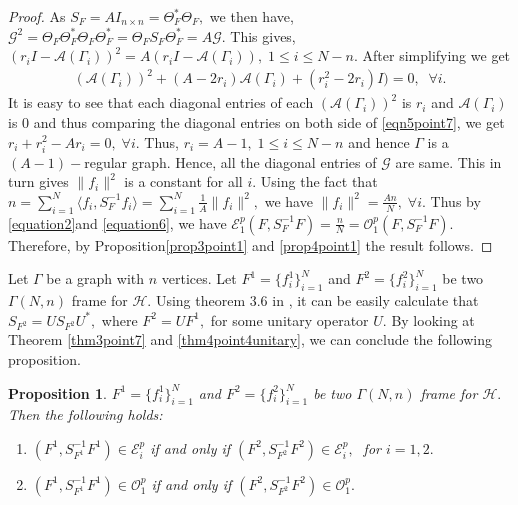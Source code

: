 \documentclass[final,1p,times]{elsarticle}
\newtheorem{prop}[thm]{Proposition}
\begin{document}
\begin{proof}
	As $S_F = AI_{n\times n} = \Theta_{F}^* \Theta_F,$ we then have, $\mathcal{G}^2 = \Theta_F \Theta_{F}^{*} \Theta_F \Theta_{F}^{*} = \Theta_F S_F \Theta_{F}^* = A\mathcal{G}.$ This gives, $\left( r_{i} I -\mathcal{A}(\Gamma_i)    \right)^2 = A\left( r_{i} I -\mathcal{A}(\Gamma_i)    \right),\;1 \leq i \leq N-n.$ After simplifying we get 
	\begin{align}\label{eqn5point7}
		\left(\mathcal{A}(\Gamma_i)\right)^2 + (A- 2r_i)\mathcal{A}(\Gamma_i) + (r_{i}^2 - 2r_i)I) =0 , \;\;\forall i.
		\end{align} 
	 It is easy to see that each diagonal entries of each $\left(\mathcal{A}(\Gamma_i)\right)^2$ is $r_i$ and $\mathcal{A}(\Gamma_i)$ is $0$ and thus comparing the  diagonal entries on both side of \eqref{eqn5point7}, we get $r_{i} + r_{i}^2 - Ar_{i} =0,\; \forall i. $ Thus, $r_i = A -1,\; 1\leq i \leq N-n$ and hence $\Gamma$ is a $(A-1)-$regular graph. Hence, all the diagonal entries of $\mathcal{G}$ are same. This in turn gives $\|f_i\|^2$ is a constant for all $i.$ Using the fact that $n =\sum\limits_{i=1}^N \langle f_i,S_{F}^{-1}f_i \rangle = \sum\limits_{i=1}^N \frac{1}{A}\|f_i\|^2,$ we have $\|f_i\|^2 = \frac{An}{N},\; \forall i.$ Thus by \eqref{equation2}and \eqref{equation6}, we have $\mathcal{E}_{1}^p (F, S_{F}^{-1}F) = \frac{n}{N}= \mathcal{O}_{1}^p (F, S_{F}^{-1}F). $ Therefore, by Proposition\ref{prop3point1} and \ref{prop4point1} the result follows.
	
\end{proof}

Let $\Gamma$ be a graph with $n$ vertices. Let $F^{1} = \{f^{1}_i\}_{i=1}^N$ and  $F^{2} = \{f^{2}_i\}_{i=1}^N$ be two $\Gamma(N,n)$ frame for $\mathcal{H}.$  Using theorem 3.6 in \cite{deep1}, it can be easily calculate that $S_{F^{2}} = U S_{F^{2}} U^{*},$ where $F^{2} = U F^{1},$ for some unitary operator $U.$ By looking at Theorem \ref{thm3point7} and \ref{thm4point4unitary}, we can conclude the following proposition.


\begin{prop}
	 $F^{1} = \{f^{1}_i\}_{i=1}^N$ and  $F^{2} = \{f^{2}_i\}_{i=1}^N$ be two $\Gamma(N,n)$ frame for $\mathcal{H}.$ Then the following holds:
	 	\begin{enumerate}
	 	\item [{\em (i)}] $\left(F^1 , S_{F^1}^{-1}F^{1}  \right) \in \mathcal{E}_{i}^p $ if and only if $\left(F^2 , S_{F^2}^{-1}F^{2}  \right) \in \mathcal{E}_{i}^p,\;$ for $i=1,2.$
	 	
	 	\item [{\em (ii)}]  $\left(F^1 , S_{F^1}^{-1}F^{1}  \right) \in \mathcal{O}_{1}^p $ if and only if $\left(F^2 , S_{F^2}^{-1}F^{2}  \right) \in \mathcal{O}_{1}^p.$
	 \end{enumerate}
\end{prop}
\end{document}
